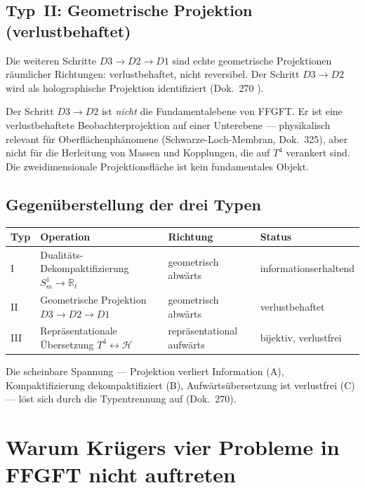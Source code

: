 \subsection{Typ~II: Geometrische Projektion (verlustbehaftet)}

Die weiteren Schritte $D3 \to D2 \to D1$ sind echte geometrische
Projektionen räumlicher Richtungen: verlustbehaftet, nicht reversibel.
Der Schritt $D3 \to D2$ wird als holographische Projektion
identifiziert (Dok.~270 \K).

\begin{tcolorbox}[ffgftbox,title={Einordnung des holographischen Schritts}]
  Der Schritt $D3 \to D2$ ist \emph{nicht} die Fundamentalebene von FFGFT.
  Er ist eine verlustbehaftete Beobachterprojektion auf einer
  Unterebene — physikalisch relevant für Oberflächenphänomene
  (Schwarze-Loch-Membran, Dok.~325), aber nicht für die
  Herleitung von Massen und Kopplungen, die auf $T^4$ verankert sind.
  Die zweidimensionale Projektionsfläche ist kein fundamentales Objekt.
\end{tcolorbox}

\subsection{Gegenüberstellung der drei Typen}

\begin{table}[h!]
\small
\begin{tabular}{@{}llll@{}}
\toprule
Typ & Operation & Richtung & Status \\
\midrule
I   & Dualitäts-Dekompaktifizierung $S^1_m \to \mathbb{R}_t$
    & geometrisch abwärts & informationserhaltend \K \\
II  & Geometrische Projektion $D3 \to D2 \to D1$
    & geometrisch abwärts & verlustbehaftet \K \\
III & Repräsentationale Übersetzung $T^4 \leftrightarrow \mathcal{H}$
    & repräsentational aufwärts & bijektiv, verlustfrei \K \\
\bottomrule
\end{tabular}
\end{table}

Die scheinbare Spannung — Projektion verliert Information (A),
Kompaktifizierung dekompaktifiziert (B), Aufwärtsübersetzung ist
verlustfrei (C) — löst sich durch die Typentrennung auf (Dok.~270).

\section{Warum Krügers vier Probleme in FFGFT nicht auftreten}
\label{sec:vergleich}

